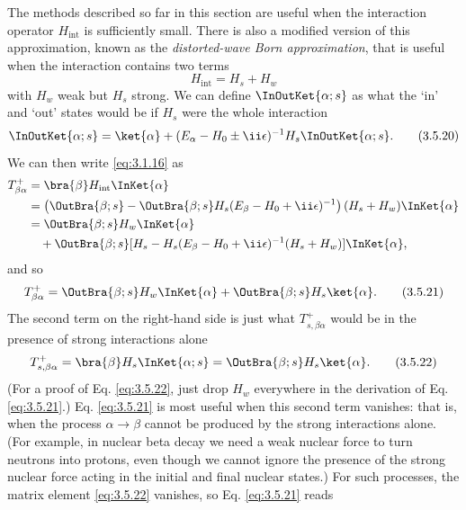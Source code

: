 The methods described so far in this section are useful when the interaction operator
$H_{\mathrm{int}}$ is sufficiently small. There is also a modified version of this approximation,
known as the \emph{distorted-wave Born approximation}, that is useful when the interaction
contains two terms
\begin{equation}
 H_{\mathrm{int}}=H_s+H_w
 \tag{3.5.19}\label{eq:3.5.19}
\end{equation}
with $H_w$ weak but $H_s$ strong. We can define $\InOutKet{\alpha;s}$ as what the
`in' and `out' states would be if $H_s$ were the whole interaction
\begin{equation}
 \InOutKet{\alpha;s}=\ket{\alpha}
 +(E_\alpha-H_0\pm \ii\epsilon)^{-1}H_s\InOutKet{\alpha;s}.
 \tag{3.5.20}\label{eq:3.5.20}
\end{equation}
We can then write \eqref{eq:3.1.16} as
\begin{align*}
 T^+_{\beta\alpha}
 &=\bra{\beta}H_{\mathrm{int}}\InKet{\alpha}\\
 &=\left(\OutBra{\beta;s}-\OutBra{\beta;s}H_s(E_\beta-H_0+\ii\epsilon)^{-1}\right)
 (H_s+H_w)\InKet{\alpha}\\
 &=\OutBra{\beta;s}H_w\InKet{\alpha}\\
 &\quad+\OutBra{\beta;s}
 [H_s-H_s(E_\beta-H_0+\ii\epsilon)^{-1}(H_s+H_w)]
 \InKet{\alpha},
\end{align*}
and so
\begin{equation}
 T^+_{\beta\alpha}=\OutBra{\beta;s}H_w\InKet{\alpha}
 +\OutBra{\beta;s}H_s\ket{\alpha}.
 \tag{3.5.21}\label{eq:3.5.21}
\end{equation}
The second term on the right-hand side is just what $T^+_{s,\beta\alpha}$ would be in the
presence of strong interactions alone
\begin{equation}
 T^+_{s,\beta\alpha}=\bra{\beta}H_s\InKet{\alpha;s}
 =\OutBra{\beta;s}H_s\ket{\alpha}.
 \tag{3.5.22}\label{eq:3.5.22}
\end{equation}
(For a proof of Eq. \eqref{eq:3.5.22}, just drop $H_w$ everywhere in the derivation of Eq. \eqref{eq:3.5.21}.)
Eq. \eqref{eq:3.5.21} is most useful when this second term vanishes: that is, when the process
$\alpha\to\beta$ cannot be produced by the strong interactions alone. (For example, in nuclear
beta decay we need a weak nuclear force to turn neutrons into protons, even though we cannot
ignore the presence of the strong nuclear force acting in the initial and final nuclear states.)
For such processes, the matrix element \eqref{eq:3.5.22} vanishes, so Eq. \eqref{eq:3.5.21} reads
